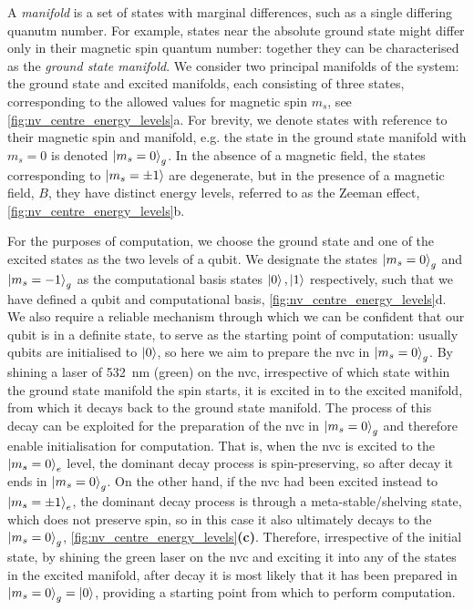 A \emph{manifold} is a set of states with marginal differences, such as a single differing quanutm number.
For example, states near the absolute ground state might differ only in their magnetic spin quantum number:
    together they can be characterised as the \emph{ground state manifold}. 
We consider two principal manifolds of the system:
    the ground state and excited manifolds, each consisting of 
    three states, corresponding to the allowed values for magnetic spin $m_s$, see \cref{fig:nv_centre_energy_levels}a. 
For brevity, we denote states with reference to their magnetic spin and manifold, 
    e.g. the state in the ground state manifold with $m_s=0$ is denoted $\ket{m_s=0}_g$. 
In the absence of a magnetic field, the states corresponding to $\ket{m_s=\pm1}$ are degenerate, 
    but in the presence of a magnetic field, $B$, they have distinct energy levels, 
    referred to as the Zeeman effect, \cref{fig:nv_centre_energy_levels}b. 
\par 

For the purposes of computation, 
    we choose the ground state and one of the excited states as the two levels of a qubit. 
We designate the states $\ket{m_s=0}_g$ and $\ket{m_s=-1}_g$ as the computational basis states $\ket{0}, \ket{1}$ respectively, 
    such that we have defined a qubit and computational basis, \cref{fig:nv_centre_energy_levels}d.
We also require a reliable mechanism through which we can be confident that our qubit is in a definite state, 
    to serve as the starting point of computation: 
    usually qubits are initialised to $\ket{0}$, 
    so here we aim to prepare the \gls{nvc} in $\ket{m_s=0}_g$.
By shining a laser of \SI{532}{\nano\metre} (green) on the \gls{nvc}, irrespective of which state within the ground state manifold the spin starts, 
    it is excited in to the excited manifold, from which it decays back to the ground state manifold.
The process of this decay can be exploited for the preparation of the \gls{nvc} in $\ket{m_s=0}_g$ 
    and therefore enable initialisation for computation.
That is, when the \gls{nvc} is excited to the $\ket{m_s=0}_e$ level, the dominant decay process is spin-preserving, 
    so after decay it ends in $\ket{m_s=0}_g$. 
On the other hand, if the \gls{nvc} had been excited instead to $\ket{m_s=\pm1}_e$,
    the dominant decay process is through a meta-stable/shelving state, 
    which does not preserve spin, so in this case it also ultimately decays to the $\ket{m_s=0}_g$, \cref{fig:nv_centre_energy_levels}\textbf{(c)}.
Therefore, irrespective of the initial state, 
    by shining the green laser on the \gls{nvc} and exciting it into any of the states in the excited manifold, 
    after decay it is most likely that it has been prepared in $\ket{m_s=0}_g = \ket{0}$, 
    providing a starting point from which to perform computation.
\par 

